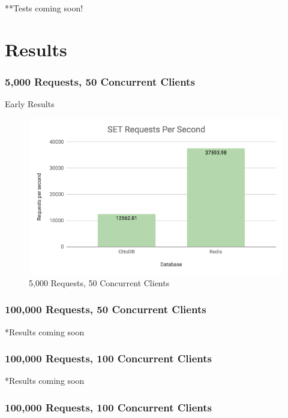 \documentclass[conference]{IEEEtran}
\begin{document}
    **Tests coming soon!

    \section{Results}

    \subsubsection{5,000 Requests, 50 Concurrent Clients}
    
    Early Results
    \begin{figure}[h]
        \centering
        \includegraphics[width=\columnwidth]{figures/5000SetRequests.png}
        \caption{5,000 Requests, 50 Concurrent Clients}
        \end{figure}

    \subsubsection{100,000 Requests, 50 Concurrent Clients}

    *Results coming soon

    \subsubsection{100,000 Requests, 100 Concurrent Clients}

    *Results coming soon

    \subsubsection{100,000 Requests, 100 Concurrent Clients}
\end{document}
